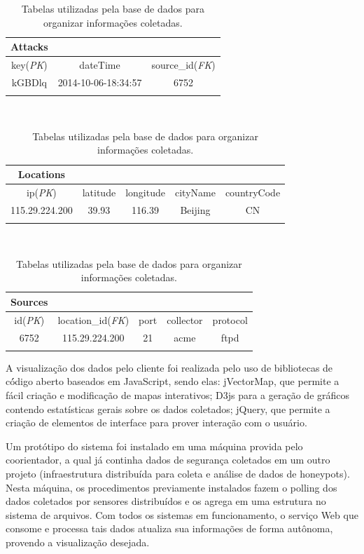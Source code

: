 \documentclass[Portuguese]
{ic-tese-v2}
\begin{document}
\begin{table}
	\center
	\caption{Tabelas utilizadas pela base de dados para organizar informações coletadas.}
	\label{tab:db}
	\begin{tabular}{|c|c|c|}
		\cline{1-1}
		\textbf{Attacks} & \multicolumn{2}{l}{}\\
		\hline
		key(\emph{PK}) & dateTime 			& source\_id(\emph{FK})\\
		\hline
		kGBDlq 			 & 2014-10-06-18:34:57  & 6752\\
		\hline
		\multicolumn{3}{c}{}\\
	\end{tabular}
	\\
	\begin{tabular}{|c|c|c|c|c|}
		\cline{1-1}
		\textbf{Locations} & \multicolumn{4}{l}{}\\
		\hline
		ip(\emph{PK}) & latitude & longitude & cityName & countryCode\\
		\hline
		115.29.224.200 & 39.93 & 116.39 & Beijing & CN\\
		\hline
		\multicolumn{5}{c}{}\\
	\end{tabular}
	\\
	\begin{tabular}{|c|c|c|c|c|}
		\cline{1-1}
		\textbf{Sources} & \multicolumn{4}{l}{}\\
		\hline
		id(\emph{PK}) & location\_id(\emph{FK}) & port & collector & protocol\\
		\hline
		6752 & 115.29.224.200 & 21 & acme & ftpd\\
		\hline
		\multicolumn{5}{c}{}\\
	\end{tabular}
\end{table}

A visualização dos dados pelo cliente foi realizada pelo uso de bibliotecas de có́digo aberto baseados em JavaScript, sendo elas: jVectorMap\cite{jvectormap}, que permite a fácil criação e modificação de mapas interativos; D3js para a geração de gráficos contendo estatísticas gerais sobre os dados coletados; jQuery\cite{jquery}, que permite a criação de elementos de interface para prover interação com o usuário.

Um protótipo do sistema foi instalado em uma máquina provida pelo coorientador, a qual já continha dados de segurança coletados em um outro projeto (infraestrutura distribuída para coleta e análise de dados de honeypots). Nesta máquina, os procedimentos previamente instalados fazem o polling dos dados coletados por sensores distribuídos e os agrega em uma estrutura no sistema de arquivos. Com todos os sistemas em funcionamento, o serviço Web que consome e processa tais dados atualiza sua informações de forma autônoma, provendo a visualização desejada.
\end{document}
